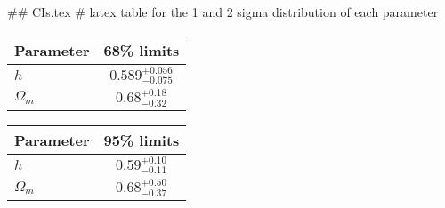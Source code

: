 ## CIs.tex
# latex table for the 1 and 2 sigma distribution of each parameter

\begin{tabular} { l  c}
 Parameter &  68\% limits\\
\hline
{\boldmath$h              $} & $0.589^{+0.056}_{-0.075}   $\\
{\boldmath$\Omega_m       $} & $0.68^{+0.18}_{-0.32}      $\\
\hline
\end{tabular}

\begin{tabular} { l  c}
 Parameter &  95\% limits\\
\hline
{\boldmath$h              $} & $0.59^{+0.10}_{-0.11}      $\\
{\boldmath$\Omega_m       $} & $0.68^{+0.50}_{-0.37}      $\\
\hline
\end{tabular}
